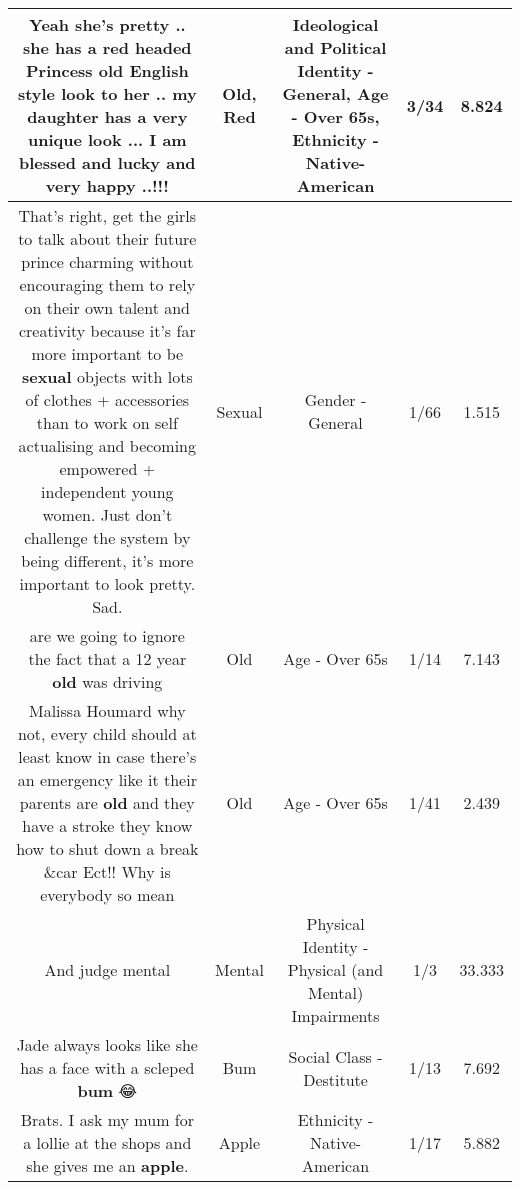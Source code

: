 \documentclass[11pt]{article}
\newlength\mylength
\begin{document}
\begin{center}
\begin{longtable}{|C{.65\mylength}|C{.30\mylength}|C{.12\mylength}|C{.12\mylength}|C{.12\mylength}|}
  \small Yeah she's pretty .. she has a \textbf{r\textbf{ed}} headed Princess \textbf{old} English style look to her .. my daughter has a very unique look ... I am blessed and lucky and very happy ..!!!\normalsize   & Old, Red &  Ideological and Political Identity - General, Age - Over 65s, Ethnicity - Native-American & 3/34 & 8.824 \\  \hline
  \small That's right, get the girls to talk about their future prince charming without encouraging them to rely on their own talent and creativity because it's far more important to be \textbf{sexual} objects with lots of clothes + accessories than to work on self actualising and becoming empowered + independent young women. Just don't challenge the system by being different, it's more important to look pretty. Sad.\normalsize   & Sexual & Gender - General & 1/66 & 1.515 \\  \hline
  \small are we going to ignore the fact that a 12 year \textbf{old} was driving\normalsize   & Old & Age - Over 65s & 1/14 & 7.143 \\  \hline
  \small Malissa Houmard why not, every child should at least know in case there's an emergency like it their parents are \textbf{old} and they have a stroke they know how to shut down a break \&car Ect!! Why is everybody so mean\normalsize   & Old & Age - Over 65s & 1/41 & 2.439 \\  \hline
  \small And judge mental\normalsize   & Mental & Physical Identity - Physical (and Mental) Impairments & 1/3 & 33.333 \\  \hline
  \small Jade always looks like she has a face with a scleped \textbf{bum} 😂\normalsize   & Bum & Social Class - Destitute & 1/13 & 7.692 \\  \hline
  \small Brats. I ask my mum for a lollie at the shops and she gives me an \textbf{apple}.\normalsize   & Apple & Ethnicity - Native-American & 1/17 & 5.882 \\  \hline

\end{longtable}
\end{center}
\end{document}
